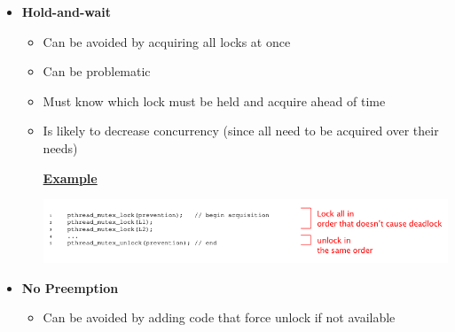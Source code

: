 \documentclass[12pt]{article}
\begin{document}
\begin{enumerate}[1.]
\begin{enumerate}[a)]
\begin{itemize}
\begin{itemize}
\begin{itemize}
\begin{itemize}
                        (Simple) \texttt{i\_mutex} before \texttt{i\_mmap\_mutex}

                        \bigskip

                        (More complex) \texttt{i\_mmap\_mutex} before \texttt{private\_lock}
                        before \texttt{swap\_lock} before \texttt{mapping->tree\_lock}

                    \end{itemize}

                    \item \textbf{Hold-and-wait}
                    \begin{itemize}
                        \item Can be avoided by acquiring all locks at once
                        \item Can be problematic
                        \item Must know which lock must be held and acquire ahead of time
                        \item Is likely to decrease concurrency (since all need to be acquired over their needs)

                        \bigskip

                        \underline{\textbf{Example}}

                        \bigskip

                        \begin{center}
                        \includegraphics[width=\linewidth]{images/midterm_2_solution_13.png}
                        \end{center}
                    \end{itemize}

                    \item \textbf{No Preemption}
                    \begin{itemize}
                        \item Can be avoided by adding code that force unlock if not available


\end{itemize}
\end{itemize}
\end{itemize}
\end{itemize}
\end{enumerate}
\end{enumerate}
\end{document}
